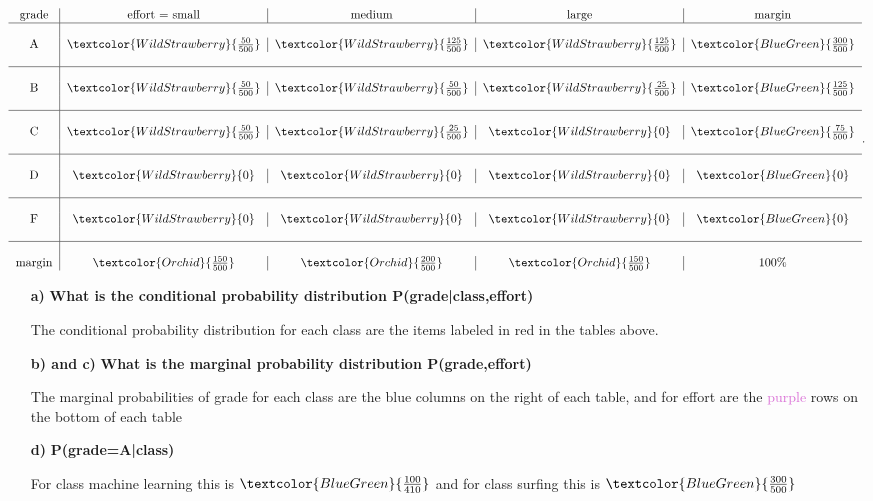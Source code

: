 \[
\begin{tabular}{c | c | c | c | c}
  grade & effort = small & medium & large & margin \\
  \hline \\
 A & $ \textcolor{WildStrawberry}{\frac{50}{500}}$
   & $ \textcolor{WildStrawberry}{ \frac{125}{500}}
 $ & $ \textcolor{WildStrawberry}{\frac{125}{500}}
 $ & $ \textcolor{BlueGreen}{\frac{300}{500}} $ \\\\
 \hline \\
 B & $ \textcolor{WildStrawberry}{\frac{50}{500}}
 $ & $ \textcolor{WildStrawberry}{\frac{50}{500}}
 $ & $\textcolor{WildStrawberry}{\frac{25}{500}}$
   & $ \textcolor{BlueGreen}{\frac{125}{500}} $ \\\\
 \hline \\
 C & $ \textcolor{WildStrawberry}{\frac{50}{500}}
 $ & $ \textcolor{WildStrawberry}{\frac{25}{500}}
 $ & $ \textcolor{WildStrawberry}{0} $ & $\textcolor{BlueGreen}{\frac{75}{500}}
 $\\ \\
 \hline \\
 D & $ \textcolor{WildStrawberry}{0}$ & $ \textcolor{WildStrawberry}{0}$
   & $ \textcolor{WildStrawberry}{0}$ & $ \textcolor{BlueGreen}{0}$ \\ \\
 \hline \\
 F & $ \textcolor{WildStrawberry}{0}$ & $ \textcolor{WildStrawberry}{0}$
   & $ \textcolor{WildStrawberry}{0}$ & $ \textcolor{BlueGreen}{0}$ \\ \\
 \hline \\
 margin & $ \textcolor{Orchid}{\frac{150}{500}}
 $ & $ \textcolor{Orchid}{\frac{200}{500}}
 $ & $ \textcolor{Orchid}{\frac{150}{500}}$ & $100\%$
\end{tabular}
.\] 

\begin{itemize}
  \item[ \textbf{a)} ] \textbf{What is the conditional probability distribution P(grade|class,effort)} 
    \par The conditional probability distribution for each class are the items
    labeled in \textcolor{WildStrawberry}{red} in the tables above.
  \item[ \textbf{b) and c)}] \textbf{What is the marginal probability distribution
    P(grade,effort)} 
    \par The marginal probabilities of grade for each class are the
    \textcolor{BlueGreen}{blue} columns on the right of each table, and for
    effort are the \textcolor{Orchid}{purple} rows on the bottom of each table
  \item[ \textbf{d)} ] \textbf{P(grade=A|class)} 
    \par For class machine learning this is
    $ \textcolor{BlueGreen}{\frac{100}{410}} $ and for class surfing this is
    $ \textcolor{BlueGreen}{\frac{300}{500}} $
\end{itemize}


